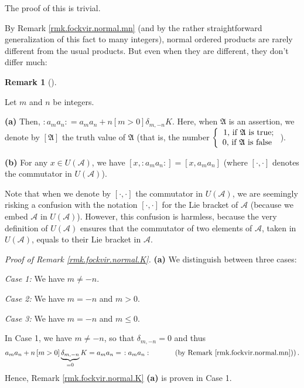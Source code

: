 \documentclass
[numbers=enddot,12pt,final,onecolumn,german,notitlepage]{scrartcl}%
\theoremstyle{definition}
\newtheorem{remk}[theo]{Remark}
\newenvironment{remark}[1][]
{\begin{remk}[#1]\begin{leftbar}}
{\end{leftbar}\end{remk}}
\begin{document}
The proof of this is trivial.

By Remark \ref{rmk.fockvir.normal.mn} (and by the rather straightforward
generalization of this fact to many integers), normal ordered products are
rarely different from the usual products. But even when they are different,
they don't differ much:

\begin{remark}
\label{rmk.fockvir.normal.K}Let $m$ and $n$ be integers.

\textbf{(a)} Then, $\left.  :a_{m}a_{n}:\right.  =a_{m}a_{n}+n\left[
m>0\right]  \delta_{m,-n}K$. Here, when $\mathfrak{A}$ is an assertion, we
denote by $\left[  \mathfrak{A}\right]  $ the truth value of $\mathfrak{A}$
(that is, the number $\left\{
\begin{array}
[c]{c}%
1\text{, if }\mathfrak{A}\text{ is true;}\\
0\text{, if }\mathfrak{A}\text{ is false }%
\end{array}
\right.  $).

\textbf{(b)} For any $x\in U\left(  \mathcal{A}\right)  $, we have $\left[
x,\left.  :a_{m}a_{n}:\right.  \right]  =\left[  x,a_{m}a_{n}\right]  $ (where
$\left[  \cdot,\cdot\right]  $ denotes the commutator in $U\left(
\mathcal{A}\right)  $).
\end{remark}

Note that when we denote by $\left[  \cdot,\cdot\right]  $ the commutator in
$U\left(  \mathcal{A}\right)  $, we are seemingly risking a confusion with the
notation $\left[  \cdot,\cdot\right]  $ for the Lie bracket of $\mathcal{A}$
(because we embed $\mathcal{A}$ in $U\left(  \mathcal{A}\right)  $). However,
this confusion is harmless, because the very definition of $U\left(
\mathcal{A}\right)  $ ensures that the commutator of two elements of
$\mathcal{A}$, taken in $U\left(  \mathcal{A}\right)  $, equals to their Lie
bracket in $\mathcal{A}$.

\textit{Proof of Remark \ref{rmk.fockvir.normal.K}.} \textbf{(a)} We
distinguish between three cases:

\textit{Case 1:} We have $m\neq-n$.

\textit{Case 2:} We have $m=-n$ and $m>0$.

\textit{Case 3:} We have $m=-n$ and $m\leq0$.

In Case 1, we have $m\neq-n$, so that $\delta_{m,-n}=0$ and thus%
\[
a_{m}a_{n}+n\left[  m>0\right]  \underbrace{\delta_{m,-n}}_{=0}K=a_{m}%
a_{n}=\left.  :a_{m}a_{n}:\right.  \ \ \ \ \ \ \ \ \ \ \left(  \text{by Remark
\ref{rmk.fockvir.normal.mn})}\right)  .
\]
Hence, Remark \ref{rmk.fockvir.normal.K} \textbf{(a)} is proven in Case 1.
\end{document}
